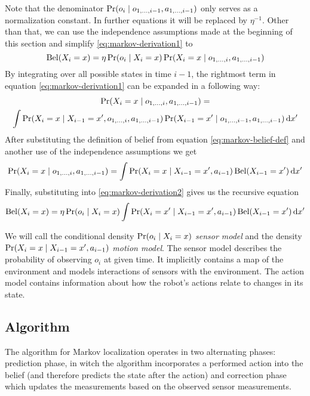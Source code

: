 Note that the denominator \(\operatorname{\mathrm{Pr}}(o_i \mid o_{1, \dotsc, i-1}, a_{1, \dotsc, i-1})\) only
serves as a normalization constant.
In further equations it will be replaced by \(\eta^{-1}\).
Other than that, we can use the independence assumptions made at the beginning
of this section and simplify \eqref{eq:markov-derivation1} to
\begin{equation}
	\label{eq:markov-derivation2}
	\operatorname{\mathrm{Bel}}(X_i = x) =
		\eta \operatorname{\mathrm{Pr}}(o_i \mid X_i = x)
		\operatorname{\mathrm{Pr}}(X_i = x \mid o_{1, \dotsc, i}, a_{1, \dotsc, i - 1})
\end{equation}
By integrating over all possible states in time \(i - 1\), the rightmost term in
equation \eqref{eq:markov-derivation1} can be expanded in a following way:
\begin{multline}
	\label{eq:markov-derivation3}
	\operatorname{\mathrm{Pr}}(X_i = x \mid o_{1, \dotsc, i}, a_{1, \dotsc, i - 1}) = \\
	\int
	\operatorname{\mathrm{Pr}}(X_i = x \mid X_{i - 1}=x', o_{1, \dotsc, i}, a_{1, \dotsc, i - 1})
	\operatorname{\mathrm{Pr}}(X_{i-1} = x' \mid o_{1, \dotsc, i-1}, a_{1, \dotsc, i-1})
	\,\mathrm{d}x'
\end{multline}
After substituting the definition of belief from equation \eqref{eq:markov-belief-def}
and another use of the independence assumptions we get
\begin{equation}
	\label{eq:markov-derivation4}
	\operatorname{\mathrm{Pr}}(X_i = x \mid o_{1, \dotsc, i}, a_{1, \dotsc, i - 1}) =
	\int
	\operatorname{\mathrm{Pr}}(X_i = x \mid X_{i - 1}=x', a_{i - 1})
	\operatorname{\mathrm{Bel}}(X_{i-1} = x')
	\,\mathrm{d}x'
\end{equation}
Finally, substituting into \eqref{eq:markov-derivation2} gives us the recursive
equation
\begin{equation}
	\label{eq:markov-final}
	\operatorname{\mathrm{Bel}}(X_i = x) =
	\eta \operatorname{\mathrm{Pr}}(o_i \mid X_i = x)
		\int
		\operatorname{\mathrm{Pr}}(X_i = x' \mid X_{i - 1}=x', a_{i - 1})
		\operatorname{\mathrm{Bel}}(X_{i-1} = x')
		\,\mathrm{d}x'
\end{equation}

We will call the conditional density \(\operatorname{\mathrm{Pr}}(o_i \mid X_i = x)\) \emph{sensor model} and
the density \(\operatorname{\mathrm{Pr}}(X_i = x \mid X_{i - 1}=x', a_{i - 1})\) \emph{motion model}.
The sensor model describes the probability of observing \(o_i\) at given time.
It implicitly contains a map of the environment and models interactions of sensors with
the environment.
The action model contains information about how the robot's actions relate to changes in its state.

\subsection{Algorithm}
The algorithm for Markov localization operates in two alternating phases:
prediction phase, in witch the algorithm incorporates a performed action into the belief
(and therefore predicts the state after the action) and correction phase which updates
the measurements based on the observed sensor measurements.

